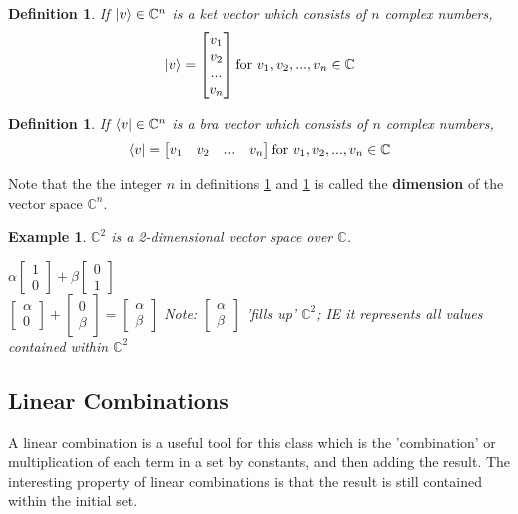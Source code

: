 \documentclass[12pt]{article}
\theoremstyle{plain}
\theoremstyle{nonumberplain}
\theoremstyle{plain}
\newtheorem{definition}[lemma]{Definition}
\newtheorem{example}[lemma]{Example}
\theoremstyle{nonumberplain}
\newcommand\1{{\bf 1}}
\newcommand{\bmat}[1]{\begin{bmatrix*} #1 \end{bmatrix*}} %
\newcommand{\C}{\mathbb{C}} %
\newcommand{\<}{\left\langle}
\renewcommand{\>}{\right\rangle}
\begin{document}
\begin{definition}\label{def:ket}
If $\ket{v}\in\C^n$ is a \textit{ket} vector which consists of $n$ complex numbers,
\begin{equation}
\ket{v}=\bmat{v_1 \\ v_2 \\ ... \\ v_n} \textrm{for } v_1, v_2, ..., v_n \in \C
\end{equation}
\end{definition}

\begin{definition}\label{def:bra}
If $\bra{v}\in\C^n$ is a \textit{bra} vector which consists of $n$ complex numbers,
\begin{equation}
\bra{v}=\bmat{v_1 & v_2 & ... & v_n} \textrm{for } v_1, v_2, ..., v_n \in \C
\end{equation}
\end{definition}
Note that the the integer $n$ in definitions \ref{def:ket} and \ref{def:bra} is called the \textbf{dimension} of the vector space $\C^n$.

\begin{example}
$\C^2$ is a 2-dimensional vector space over $\C$.
\begin{center}
$\alpha\bmat{1 \\ 0} + \beta\bmat{0 \\ 1}$ \\
$\bmat{\alpha \\ 0}+\bmat{0 \\ \beta}=\bmat{\alpha \\ \beta}$
Note: $\bmat{\alpha \\ \beta}$ 'fills up' $\C^2$; IE it represents all values contained within $\C^2$
\end{center}
\end{example}


\subsection{Linear Combinations}
A linear combination is a useful tool for this class which is the 'combination' or multiplication of each term in a set by constants, and then adding the result. The interesting property of linear combinations is that the result is still contained within the initial set.
\end{document}

